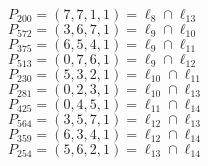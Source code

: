 \documentclass{article}
\begin{document}
{\begin{multicols}{2}
$P_{200} = ( 7, 7, 1, 1 ) = \ell_{8} \cap \ell_{13} $\\
$P_{572} = ( 3, 6, 7, 1 ) = \ell_{9} \cap \ell_{10} $\\
$P_{375} = ( 6, 5, 4, 1 ) = \ell_{9} \cap \ell_{11} $\\
$P_{513} = ( 0, 7, 6, 1 ) = \ell_{9} \cap \ell_{12} $\\
$P_{230} = ( 5, 3, 2, 1 ) = \ell_{10} \cap \ell_{11} $\\
$P_{281} = ( 0, 2, 3, 1 ) = \ell_{10} \cap \ell_{13} $\\
$P_{425} = ( 0, 4, 5, 1 ) = \ell_{11} \cap \ell_{14} $\\
$P_{564} = ( 3, 5, 7, 1 ) = \ell_{12} \cap \ell_{13} $\\
$P_{359} = ( 6, 3, 4, 1 ) = \ell_{12} \cap \ell_{14} $\\
$P_{254} = ( 5, 6, 2, 1 ) = \ell_{13} \cap \ell_{14} $\\
\end{multicols}
}
\end{document}

